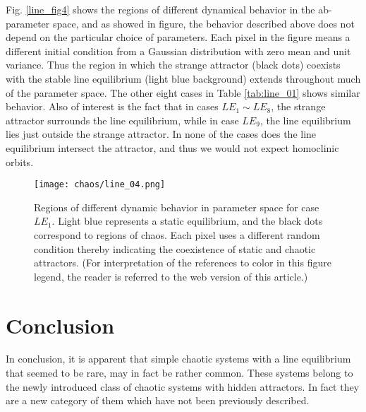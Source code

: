 Fig. \ref{line_fig4} shows the regions of different
dynamical behavior in the ab-parameter space, and as showed in figure, the behavior described above does not
depend on the particular choice of parameters.
Each pixel in the figure means a different initial condition from a Gaussian distribution
with zero mean and unit variance.
Thus the region in which the strange attractor (black dots) coexists with the
stable line equilibrium (light blue background) extends
throughout much of the parameter space. The other eight
cases in Table \ref{tab:line_01} shows similar behavior.
Also of interest is the fact that in cases $LE_1\sim{}LE_8$, the
strange attractor surrounds the line equilibrium, while in
case $LE_9$, the line equilibrium lies just outside the strange
attractor. In none of the cases does the line equilibrium
intersect the attractor, and thus we would not expect
homoclinic orbits.

\begin{figure}[htbp]
\centering
\texttt{[image: chaos/line\_04.png]}
\caption{\label{fig:line_fig4}
Regions of different dynamic behavior in parameter space for case $LE_1$. Light blue represents a static equilibrium, and the black dots correspond to
regions of chaos. Each pixel uses a different random condition thereby indicating the coexistence of static and chaotic attractors. (For interpretation of the
references to color in this figure legend, the reader is referred to the web version of this article.)}
\end{figure}

\section{Conclusion}

In conclusion, it is apparent that simple chaotic systems
with a line equilibrium that seemed to be rare, may in fact
be rather common. These systems belong to the newly
introduced class of chaotic systems with hidden attractors.
In fact they are a new category of them which have not
been previously described.



